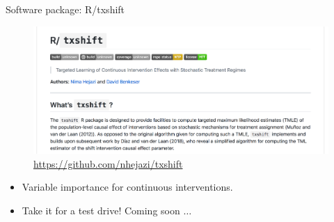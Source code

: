 \documentclass[12pt,t,handout]{beamer}
\begin{document}

\begin{frame}[c]{Software package: R/txshift}

\begin{figure}[H]
  \centering
  \includegraphics[width=\textwidth]{txshift}
  \caption{
    \url{https://github.com/nhejazi/txshift}
  }
\end{figure}

\begin{center}
\begin{itemize}
  \itemsep4pt
  \item Variable importance for continuous interventions.
  \item Take it for a test drive! Coming soon $\ldots$
\end{itemize}
\end{center}


\end{frame}

\end{document}
